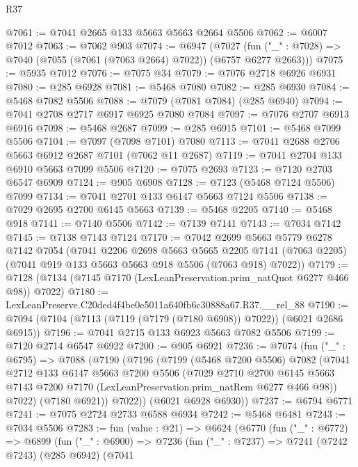 \begin{lexlean}{R37}
\begin{coremodule}
@7061 := @7041 @2665 @133 @5663 @5663 @2664 @5506
@7062 := @6007 @7012
@7063 := @7062 @903
@7074 := @6947
    (@7027 (fun ("_" : @7028) => @7040 (@7055 (@7061 (@7063 @2664) @7022)) (@6757 @6277 @2663)))
@7075 := @5935 @7012
@7076 := @7075 @34
@7079 := @7076 @2718 @6926 @6931
@7080 := @285 @6928
@7081 := @5468 @7080
@7082 := @285 @6930
@7084 := @5468 @7082 @5506
@7088 := @7079 (@7081 @7084) (@285 @6940)
@7094 := @7041 @2708 @2717 @6917 @6925 @7080 @7084
@7097 := @7076 @2707 @6913 @6916
@7098 := @5468 @2687
@7099 := @285 @6915
@7101 := @5468 @7099 @5506
@7104 := @7097 (@7098 @7101) @7080
@7113 := @7041 @2688 @2706 @5663 @6912 @2687 @7101 (@7062 @11 @2687)
@7119 := @7041 @2704 @133 @6910 @5663 @7099 @5506
@7120 := @7075 @2693
@7123 := @7120 @2703 @6547 @6909
@7124 := @905 @6908
@7128 := @7123 (@5468 @7124 @5506) @7099
@7134 := @7041 @2701 @133 @6147 @5663 @7124 @5506
@7138 := @7029 @2695 @2700 @6145 @5663
@7139 := @5468 @2205
@7140 := @5468 @918
@7141 := @7140 @5506
@7142 := @7139 @7141
@7143 := @7034 @7142
@7145 := @7138 @7143 @7124
@7170 := @7042
    @2699
    @5663
    @5779
    @6278
    @7142
    @7054
    (@7041
      @2206
      @2698
      @5663
      @5665
      @2205
      @7141
      (@7063 @2205)
      (@7041 @919 @133 @5663 @5663 @918 @5506 (@7063 @918) @7022))
@7179 := @7128 (@7134 (@7145 @7170 (LexLeanPreservation.prim_natQuot @6277 @466 @98)) @7022)
@7180 := LexLeanPreserve.C20ded4f4be0e5011a640fb6c30888a67.R37.__rel_88
@7190 := @7094 (@7104 (@7113 (@7119 (@7179 (@7180 @6908)) @7022)) (@6021 @2686 @6915))
@7196 := @7041 @2715 @133 @6923 @5663 @7082 @5506
@7199 := @7120 @2714 @6547 @6922
@7200 := @905 @6921
@7236 := @7074
    (fun ("_" : @6795) =>
    @7088
      (@7190
        (@7196
          (@7199
            (@5468 @7200 @5506)
            @7082
            (@7041
              @2712
              @133
              @6147
              @5663
              @7200
              @5506
              (@7029
                @2710
                @2700
                @6145
                @5663
                @7143
                @7200
                @7170
                (LexLeanPreservation.prim_natRem @6277 @466 @98))
              @7022)
            (@7180 @6921))
          @7022))
      (@6021 @6928 @6930))
@7237 := @6794 @6771
@7241 := @7075 @2724 @2733 @6588 @6934
@7242 := @5468 @6481
@7243 := @7034 @5506
@7283 := fun (value : @21) =>
  @6624
    (@6770
      (fun ("_" : @6772) =>
      @6899
        (fun ("_" : @6900) =>
        @7236
          (fun ("_" : @7237) =>
          @7241
            (@7242 @7243)
            (@285 @6942)
            (@7041

\end{coremodule}
\end{lexlean}

